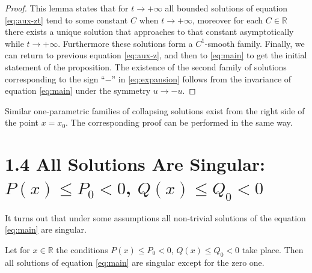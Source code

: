 \begin{proof}
	This lemma states that for $t \to +\infty$ all bounded solutions of equation \eqref{eq:aux-zt} tend to some constant $C$ when $t \to +\infty$, moreover for each $C \in \mathbb{R}$ there exists a unique solution that approaches to that constant asymptotically while $t \to +\infty$.
	Furthermore these solutions form a $C^1$-smooth family.
	Finally, we can return to previous equation \eqref{eq:aux-z}, and then to \eqref{eq:main} to get the initial statement of the proposition.
	The existence of the second family of solutions corresponding to the sign ``$-$'' in \eqref{eq:expansion} follows from the invariance of equation \eqref{eq:main} under the symmetry $u \to -u$.
\end{proof}

Similar one-parametric families of collapsing solutions exist from the right side of the point $x = x_0$.
The corresponding proof can be performed in the same way.

\section*{1.4 All Solutions Are Singular: $P(x) \le P_0 < 0$, $Q(x) \le Q_0 < 0$}

It turns out that under some assumptions all non-trivial solutions of the equation \eqref{eq:main} are singular.
\begin{proposition}
\label{prop:all-solutions-are-singular}
	Let for $x \in \mathbb{R}$ the conditions $P(x) \le P_0 < 0$, $Q(x) \le Q_0 < 0$ take place.
	Then all solutions of equation \eqref{eq:main} are singular except for the zero one.
\end{proposition}

